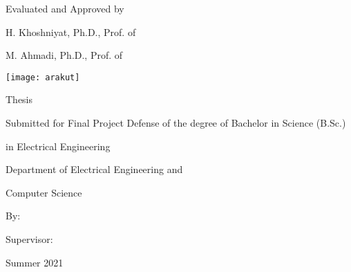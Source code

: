 \begin{latin}
\begin{center}
\doublespacing

Evaluated and Approved by \dotfill

\dotfill H. Khoshniyat, Ph.D., Prof. of \insten

\dotfill M. Ahmadi, Ph.D., Prof. of \insten

\vspace{5mm}\dateen

\clearpage
\thispagestyle{empty}
\onehalfspacing

\texttt{[image: arakut]}

\begin{bold}
\vspace{-5mm}\small \insten\par
\vspace{1cm}\Large\titleen\par
\end{bold}

\vspace{2cm}\normalsize Thesis\par Submitted for Final Project Defense of the degree of Bachelor in Science (B.Sc.)\par in Electrical Engineering\par \insten\par Department of Electrical Engineering and\par Computer Science\par
\vspace{2cm}\large By:\par \Large\textbf\authoren\par
\vspace{2cm}\large Supervisor:\par \Large\textbf\supervisoren\par
\vspace{25mm}\normalsize Summer 2021\par
\end{center}

\end{latin}
